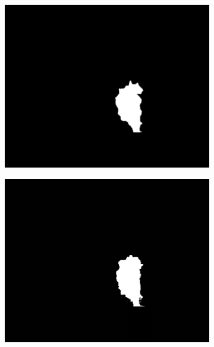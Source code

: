 \documentclass[14pt, a4paper]{extreport}
\begin{document}
\begin{figure}[h!]
\begin{subfigure}{.32\textwidth}
			\includegraphics[width = \textwidth]{image/chapter_3/examples/mask_razmet/214}
		\end{subfigure}
		\begin{subfigure}{.32\textwidth}
			\centering
			\includegraphics[width = \textwidth]{image/chapter_3/examples/mask/214}
		\end{subfigure}
		\begin{subfigure}{.32\textwidth}
			\centering

\end{subfigure}
\end{figure}
\end{document}
